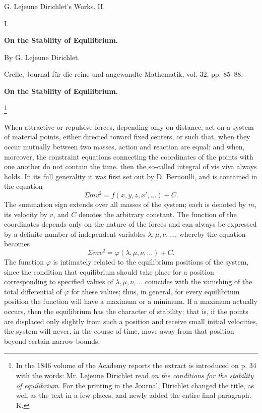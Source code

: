 \documentclass[11pt]{article}
\begin{document}
\begin{center}
{\Large G. Lejeune Dirichlet's Works. II.}\par\vspace{1.5em}
{\Large I.}\par\vspace{0.5em}
{\LARGE \textbf{On the Stability of Equilibrium.}}\par\vspace{1em}
{\large By G. Lejeune Dirichlet.}\par\vspace{0.5em}
{\small Crelle, Journal für die reine und angewandte Mathematik, vol. 32, pp. 85--88.}
\end{center}

\begin{center}
\textbf{On the Stability of Equilibrium.}
\end{center}

\footnote{In the 1846 volume of the Academy reports the extract is introduced on p. 34 with the words: Mr. Lejeune Dirichlet read \emph{on the conditions for the stability of equilibrium}. For the printing in the Journal, Dirichlet changed the title, as well as the text in a few places, and newly added the entire final paragraph. K.}

When attractive or repulsive forces, depending only on distance, act on a system of material points, either directed toward fixed centers, or such that, when they occur mutually between two masses, action and reaction are equal; and when, moreover, the constraint equations connecting the coordinates of the points with one another do not contain the time, then the so-called integral of vis viva always holds. In its full generality it was first set out by D. Bernoulli, and is contained in the equation
\[
\Sigma m v^2 = f(x,y,z,x',\ldots)+C.
\]
The summation sign extends over all masses of the system; each is denoted by $m$, its velocity by $v$, and $C$ denotes the arbitrary constant. The function of the coordinates depends only on the nature of the forces and can always be expressed by a definite number of independent variables $\lambda,\mu,\nu,\ldots$, whereby the equation becomes
\[
\Sigma m v^2 = \varphi(\lambda,\mu,\nu,\ldots)+C.
\]
The function $\varphi$ is intimately related to the equilibrium positions of the system, since the condition that equilibrium should take place for a position corresponding to specified values of $\lambda,\mu,\nu,\ldots$ coincides with the vanishing of the total differential of $\varphi$ for these values; thus, in general, for every equilibrium position the function will have a maximum or a minimum. If a maximum actually occurs, then the equilibrium has the character of stability; that is, if the points are displaced only slightly from such a position and receive small initial velocities, the system will never, in the course of time, move away from that position beyond certain narrow bounds.
\end{document}
